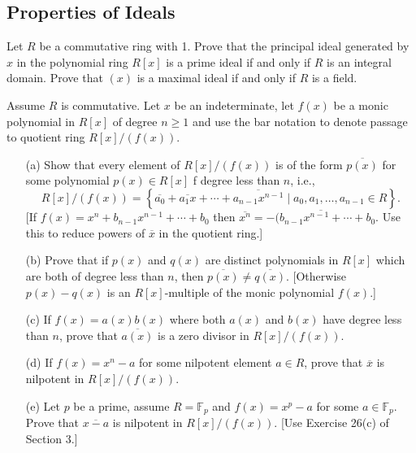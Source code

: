 \documentclass[10pt]{article}
\newcommand{\F}{\mathbb{F}}
\begin{document}
\subsection{Properties of Ideals}

\begin{problem}[title=Problem 7]
    \par Let \(R\) be a commutative ring with 1. Prove that the principal ideal generated by \(x\) in the polynomial ring \(R[x]\) is a prime ideal if and only if \(R\) is an integral domain. Prove that \((x)\) is a maximal ideal if and only if \(R\) is a field.
\end{problem}

\begin{problem}[title=Problem 14]
    \par Assume \(R\) is commutative. Let \(x\) be an indeterminate, let \(f(x)\) be a monic polynomial in \(R[x]\) of degree \(n\geq 1\) and use the bar notation to denote passage to quotient ring \(R[x]/(f(x))\).
    \begin{itemize}
        \item[(a)] Show that every element of \(R[x]/(f(x))\) is of the form \(\overline{p(x)}\) for some polynomial \(p(x)\in R[x]\) f degree less than \(n\), i.e.,
        \[R[x]/(f(x))=\left\{\overline{a_0}+\overline{a_1x}+\cdots+\overline{a_{n-1}x^{n-1}}\mid a_0,a_1,\dots,a_{n-1}\in R\right\}.\]
        [If \(f(x)=x^n+b_{n-1}x^{n-1}+\cdots+b_0\) then \(\overline{x^n}=\overline{-(b_{n-1}x^{n-1}+\cdots+b_0}\). Use this to reduce powers of \(\overline{x}\) in the quotient ring.]
        \item[(b)] Prove that if \(p(x)\) and \(q(x)\) are distinct polynomials in \(R[x]\) which are both of degree less than \(n\), then \(\overline{p(x)}\neq\overline{q(x)}\). [Otherwise \(p(x)-q(x)\) is an \(R[x]\)-multiple of the monic polynomial \(f(x)\).]
        \item[(c)] If \(f(x)=a(x)b(x)\) where both \(a(x)\) and \(b(x)\) have degree less than \(n\), prove that \(\overline{a(x)}\) is a zero divisor in \(R[x]/(f(x))\).
        \item[(d)] If \(f(x)=x^n-a\) for some nilpotent element \(a\in R\), prove that \(\overline{x}\) is nilpotent in \(R[x]/(f(x))\).
        \item[(e)] Let \(p\) be a prime, assume \(R=\F_p\) and \(f(x)=x^p-a\) for some \(a\in\F_p\). Prove that \(\overline{x-a}\) is nilpotent in \(R[x]/(f(x))\). [Use Exercise 26(c) of Section 3.]
    \end{itemize}
\end{problem}
\end{document}
